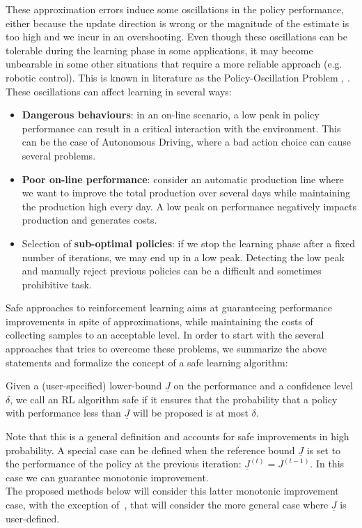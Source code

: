 These approximation errors induce some oscillations in the policy performance, either because the update direction is wrong or the magnitude of the estimate is too high and we incur in an overshooting. Even though these oscillations can be tolerable during the learning phase in some applications, it may become unbearable in some other situations that require a more reliable approach (e.g. robotic control). This is known in literature as the Policy-Oscillation Problem \cite{Bertsekas2011}, \cite{NIPS2011_4274}. These oscillations can affect learning in several ways:
\begin{itemize}
\item \textbf{Dangerous behaviours}: in an on-line scenario, a low peak in policy performance can result in a critical interaction with the environment. This can be the case of Autonomous Driving, where a bad action choice can cause several problems.
\item \textbf{Poor on-line performance}: consider an automatic production line where we want to improve the total production over several days while maintaining the production high every day. A low peak on performance negatively impacts production and generates costs.
\item Selection of \textbf{sub-optimal policies}: if we stop the learning phase after a fixed number of iterations, we may end up in a low peak. Detecting the low peak and manually reject previous policies can be a difficult and sometimes prohibitive task.
\end{itemize}

Safe approaches to reinforcement learning aims at guaranteeing performance improvements in spite of approximations, while maintaining the costs of collecting samples to an acceptable level.
In order to start with the several approaches that tries to overcome these problems, we summarize the above statements and formalize the concept of a safe learning algorithm:
\begin{definition}
\label{def:safety}
Given a (user-specified) lower-bound $\underline{J}$ on the performance and a confidence level $\delta$, we call an RL algorithm safe if it ensures that the probability that a policy with performance less than $\underline{J}$ will be proposed is at most $\delta$.
\end{definition}

Note that this is a general definition and accounts for safe improvements in high probability. A special case can be defined when the reference bound $\underline{J}$ is set to the performance of the policy at the previous iteration: $\underline{J}^{(t)} = J^{(t-1)}$. In this case we can guarantee monotonic improvement.\\
The proposed methods below will consider this latter monotonic improvement case, with the exception of~, that will consider the more general case where $\underline{J}$ is user-defined.

